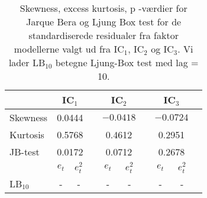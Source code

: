 \begin{table}
\center
\begin{tabular}{lccccccccc} \toprule
& \multicolumn{2}{c}{IC$_1$} & & \multicolumn{2}{c}{IC$_2$} & &\multicolumn{2}{c}{IC$_3$} \\ \midrule
Skewness & \multicolumn{2}{c}{0.0444} & & \multicolumn{2}{c}{$-0.0418$}  & & \multicolumn{2}{c}{$-0.0724$}   \\
Kurtosis & \multicolumn{2}{c}{0.5768} & & \multicolumn{2}{c}{0.4612}  & & \multicolumn{2}{c}{0.2951}\\
JB-test & \multicolumn{2}{c}{0.0172} & & \multicolumn{2}{c}{0.0712}  & & \multicolumn{2}{c}{0.2678} \\ \cmidrule{2-3}\cmidrule{5-6} \cmidrule{8-9} 
& $e_t$ & $e_t^2$ && $e_t$ & $e_t^2$  && $e_t$ & $e_t^2$  \\
LB$_{10}$ & -  &  - && -  &  -&& - & - \\ \bottomrule
\end{tabular}
\caption{Skewness, excess kurtosis, p -værdier for Jarque Bera og Ljung Box test for de standardiserede residualer fra faktor modellerne valgt ud fra IC$_1$, IC$_2$ og IC$_3$. Vi lader LB$_{10}$ betegne Ljung-Box test med lag = 10. } \label{tab:test_faktor}
\end{table}